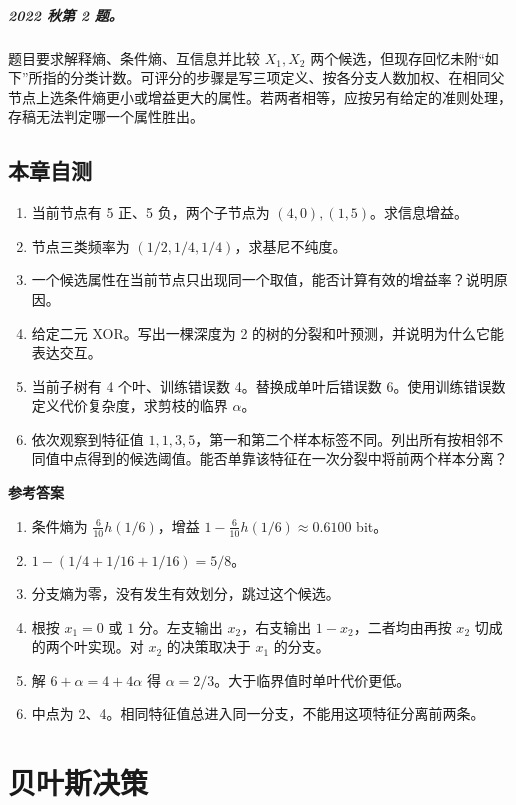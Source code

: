 \documentclass[UTF8,a4paper,zihao=-4,fontset=fandol]{ctexrep}
\begin{document}
\paragraph{2022 秋第 2 题。} 题目要求解释熵、条件熵、互信息并比较 $X_1,X_2$ 两个候选，但现存回忆未附“如下”所指的分类计数。可评分的步骤是写三项定义、按各分支人数加权、在相同父节点上选条件熵更小或增益更大的属性。若两者相等，应按另有给定的准则处理，存稿无法判定哪一个属性胜出。

\section{本章自测}
\begin{enumerate}
\item 当前节点有 5 正、5 负，两个子节点为 $(4,0),(1,5)$。求信息增益。
\item 节点三类频率为 $(1/2,1/4,1/4)$，求基尼不纯度。
\item 一个候选属性在当前节点只出现同一个取值，能否计算有效的增益率？说明原因。
\item 给定二元 XOR。写出一棵深度为 2 的树的分裂和叶预测，并说明为什么它能表达交互。
\item 当前子树有 4 个叶、训练错误数 4。替换成单叶后错误数 6。使用训练错误数定义代价复杂度，求剪枝的临界 $\alpha$。
\item 依次观察到特征值 $1,1,3,5$，第一和第二个样本标签不同。列出所有按相邻不同值中点得到的候选阈值。能否单靠该特征在一次分裂中将前两个样本分离？
\end{enumerate}
\textbf{参考答案}
\begin{enumerate}
\item 条件熵为 $\tfrac6{10}h(1/6)$，增益 $1-\tfrac6{10}h(1/6)\approx0.6100$ bit。
\item $1-(1/4+1/16+1/16)=5/8$。
\item 分支熵为零，没有发生有效划分，跳过这个候选。
\item 根按 $x_1=0$ 或 $1$ 分。左支输出 $x_2$，右支输出 $1-x_2$，二者均由再按 $x_2$ 切成的两个叶实现。对 $x_2$ 的决策取决于 $x_1$ 的分支。
\item 解 $6+\alpha=4+4\alpha$ 得 $\alpha=2/3$。大于临界值时单叶代价更低。
\item 中点为 2、4。相同特征值总进入同一分支，不能用这项特征分离前两条。
\end{enumerate}

\chapter{贝叶斯决策}
\label{ch:prml-bayes}
\end{document}
